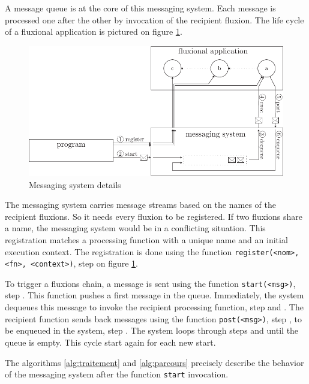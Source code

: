 A message queue is at the core of this messaging system.
Each message is processed one after the other by invocation of the recipient fluxion.
The life cycle of a fluxional application is pictured on figure \ref{fig:MesSys}.

\begin{figure}[h!]
  \includegraphics[width=\linewidth]{ressources/schema-message.pdf}
  \caption{Messaging system details}
  \label{fig:MesSys}
\end{figure}

The messaging system carries message streams based on the names of the recipient fluxions.
So it needs every fluxion to be registered.
If two fluxions share a name, the messaging system would be in a conflicting situation.
This registration matches a processing function with a unique name and an initial execution context.
The registration is done using the function \texttt{register(<nom>, <fn>, <context>)}, step  on figure \ref{fig:MesSys}.

To trigger a fluxions chain, a message is sent using the function \texttt{start(<msg>)}, step .
This function pushes a first message in the queue.
Immediately, the system dequeues this message to invoke the recipient processing function, step  and .
The recipient function sends back messages using the function \texttt{post(<msg>)}, step , to be enqueued in the system, step .
The system loops through steps  and  until the queue is empty.
This cycle start again for each new start.

The algorithms \ref{alg:traitement} and \ref{alg:parcours} precisely describe the behavior of the messaging system after the function \texttt{start} invocation.

